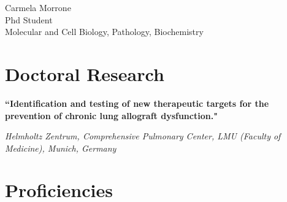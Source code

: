 \documentclass[10pt]{article} %
\begin{document}
\begin{paracol}{2} %


\parbox[top][0.12\textheight][c]{\linewidth}{ %
	\vspace{-0.04\textheight} %
	\centering %
	{\sffamily\Huge Carmela Morrone}\\\medskip %
	{\color{headings} \large Phd Student}\\\medskip 
	{\color{headings} Molecular and Cell Biology, Pathology, Biochemistry}
}


\section{Doctoral Research}

{\raggedright\textbf{``Identification and testing of new therapeutic targets for the prevention of
chronic lung allograft dysfunction."}\\\medskip}

\textit{Helmholtz Zentrum, Comprehensive Pulmonary Center, LMU (Faculty
of Medicine), Munich, Germany}
\medskip %


\section{Proficiencies}




\end{paracol}
\end{document}
